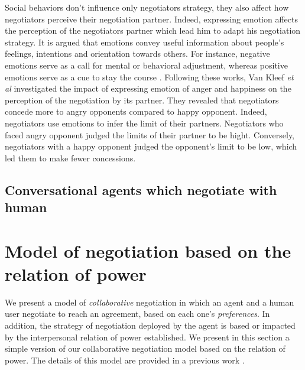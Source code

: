\documentclass[runningheads,a4paper]{llncs}
\begin{document}
			Social behaviors don't influence only  negotiators strategy, they also affect how negotiators perceive their negotiation partner. Indeed, expressing emotion affects the perception of the negotiators partner which lead him to adapt his negotiation strategy. It is argued that emotions convey useful information about people’s feelings, intentions and orientation towards others. For instance, negative emotions serve as a call for
			mental or behavioral adjustment, whereas positive emotions serve as a cue to stay the course \cite{cacioppo1999emotion}. Following these works, Van Kleef \textit{et al} investigated the impact of expressing emotion of anger and happiness on the perception of the negotiation by its partner\cite{van2006power}. They revealed that negotiators concede more to angry opponents compared to happy opponent. Indeed, negotiators use emotions to infer the limit of their partners. Negotiators who faced angry opponent judged the limits of their partner to be hight. Conversely, negotiators with a happy opponent judged the opponent’s limit to be low, which led them to make fewer concessions.
			
			\subsection{Conversational agents which negotiate with human}
			
			
	
	\section{Model of negotiation based on the relation of power}
	We present a model of \textit{collaborative} negotiation in which an agent and a human user negotiate to reach an agreement, based on each one's \textit{preferences}. In addition, the strategy of negotiation deployed by the agent is based or impacted by the interpersonal relation of power established.
	We present in this section a simple version of our collaborative negotiation model based on the relation of power. The details of this model are  provided in a previous work \cite{ouali2017computational}.
\end{document}
